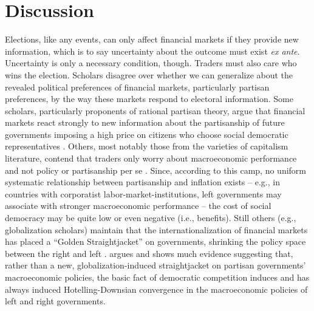 \documentclass[12pt]{article}
\begin{document}
\section{Discussion}

Elections, like any events, can only affect financial markets if they provide new information, which is to say uncertainty about the outcome must exist \textit{ex ante}. Uncertainty is only a necessary condition, though. Traders must also care who wins the election. Scholars disagree over whether we can generalize about the revealed political preferences of financial markets, particularly partisan preferences, by the way these markets respond to electoral information. Some scholars, particularly proponents of rational partisan theory, argue that financial markets react strongly to new information about the partisanship of future governments imposing a high price on citizens who choose social democratic representatives \citep{Alesina1997, Herron2000}. Others, most notably those from the varieties of capitalism literature, contend that traders only worry about macroeconomic performance and not policy or partisanship per se \citep{Mosley2000, Garrett1998}. Since, according to this camp, no uniform systematic relationship between partisanship and inflation exists -- e.g., in countries with corporatist labor-market-institutions, left governments may associate with stronger macroeconomic performance -- the cost of social democracy may be quite low or even negative (i.e., benefits). Still others (e.g., globalization scholars) maintain that the internationalization of financial markets has placed a ``Golden Straightjacket'' on governments, shrinking the policy space between the right and left \citep{Rodrik2000}. \citet{Clark2003} argues and shows much evidence suggesting that, rather than a new, 
globalization-induced straightjacket on partisan governments' macroeconomic policies, the basic fact of democratic competition induces and has always induced Hotelling-Downsian convergence in the macroeconomic policies of left and right governments. 
\end{document}
